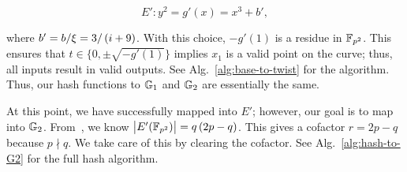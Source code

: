 \begin{equation}
    E':y^{2} = g'(x) = x^{3} + b',
\end{equation}

\noindent
where $b' = b/\xi = 3/\left( i+9 \right)$.
With this choice, $-g'(1)$ is a residue in $\mathbb{F}_{p^{2}}$.
This ensures that $t\in\{0,\pm\sqrt{-g'(1)}\}$
implies $x_{1}$ is a valid point on the curve;
thus, all inputs result in valid outputs.
See Alg.~\ref{alg:base-to-twist} for the algorithm.
Thus, our hash functions to $\mathbb{G}_{1}$ and $\mathbb{G}_{2}$ are
essentially the same.

At this point, we have successfully mapped into $E'$;
however, our goal is to map into $\mathbb{G}_{2}$.
From~\cite{bnCurves}, we know $\left| E'(\mathbb{F}_{p^{2}}) \right| = q\left( 2p-q \right)$.
This gives a cofactor $r = 2p-q$ because $p\nmid q$.
We take care of this by clearing the cofactor.
See Alg.~\ref{alg:hash-to-G2} for the full hash algorithm.

\clearpage






